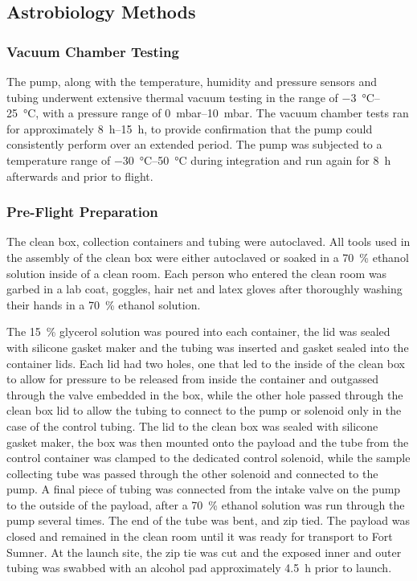 \subsection{Astrobiology Methods}
\label{sec:Astrobiology Methods}

\subsubsection{Vacuum Chamber Testing}


The pump, along with the temperature, humidity and pressure sensors and tubing underwent extensive thermal vacuum testing in the range of \SIrange{-3}{25}{\celsius}, with a pressure range of \SIrange{0}{10}{\milli\bar}. The vacuum chamber tests ran for approximately \SIrange{8}{15}{\hour}, to provide confirmation that the pump could consistently perform over an extended period. The pump was subjected to a temperature range of \SIrange{-30}{50}{\celsius} during integration and run again for \SI{8}{\hour} afterwards and prior to flight.


\subsubsection{Pre-Flight Preparation}


The clean box, collection containers and tubing were autoclaved. All tools used in the assembly of the clean box were either autoclaved or soaked in a \SI{70}{\percent} ethanol solution inside of a clean room. Each person who entered the clean room was garbed in a lab coat, goggles, hair net and latex gloves after thoroughly washing their hands in a \SI{70}{\percent} ethanol solution. 

The \SI{15}{\percent} glycerol solution was poured into each container, the lid was sealed with silicone gasket maker and the tubing was inserted and gasket sealed into the container lids. Each lid had two holes, one that led to the inside of the clean box to allow for pressure to be released from inside the container and outgassed through the valve embedded in the box, while the other hole passed through the clean box lid to allow the tubing to connect to the pump or solenoid only in the case of the control tubing. The lid to the clean box was sealed with silicone gasket maker, the box was then mounted onto the payload and the tube from the control container was clamped to the dedicated control solenoid, while the sample collecting tube was passed through the other solenoid and connected to the pump. A final piece of tubing was connected from the intake valve on the pump to the outside of the payload, after a \SI{70}{\percent} ethanol solution was run through the pump several times. The end of the tube was bent, and zip tied. The payload was closed and remained in the clean room until it was ready for transport to Fort Sumner.  At the launch site, the zip tie was cut and the exposed inner and outer tubing was swabbed with an alcohol pad approximately \SI{4.5}{\hour} prior to launch. 



